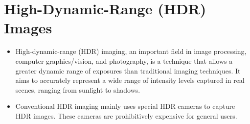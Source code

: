 \documentclass{beamer}
\begin{document}
		
	
	\section{High-Dynamic-Range (HDR) Images}
		    \begin{frame}
			    \begin{itemize} 
			    \item 
			    High-dynamic-range (HDR) imaging, an important field in image
                processing, computer graphics/vision, and photography,  
                is a technique that allows a greater dynamic range of exposures
                than traditional imaging techniques. It aims to accurately represent
                a wide range of intensity levels captured in real scenes, ranging
                from sunlight to shadows.
			  
                \end{itemize}
		    \end{frame}
		    
		    \begin{frame}
		        \begin{itemize}
		        \item 
		        Conventional HDR imaging mainly uses special HDR cameras to capture HDR images.  These cameras are prohibitively expensive for
                general users. 
		        \end{itemize}
		    \end{frame}
	
\end{document}
